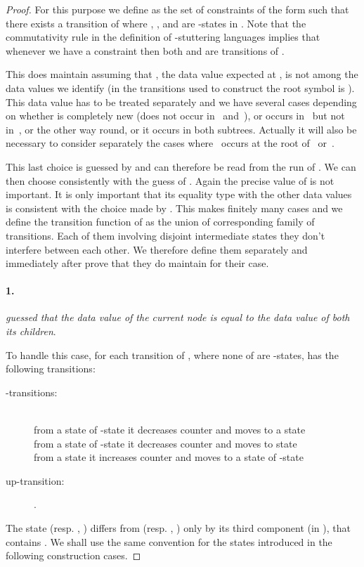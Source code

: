 \documentclass{CSML}
\begin{document}
\begin{proof}
For this purpose we define  as the set of constraints of the form
 such that there exists a transition  of  where , , and  are -states in
.  Note that the commutativity rule in the
definition of -stuttering languages implies that whenever we have a
constraint  then both  and
 are transitions of .

This does maintain  assuming that , the data value expected at ,
is not among the data values we identify (in the transitions used to construct
 the root symbol is ). This data value  has to be treated
separately and we have several cases depending on whether  is completely new
(does not occur in~ and~), or occurs in~ but
not in~, or the other way round, or it occurs in both subtrees. Actually it
will also be necessary to consider separately the cases where~ occurs at the
root of~ or~.

This last choice is guessed by  and can therefore be read from the run
of . We can then choose  consistently with the guess of . Again
the precise value of  is not important. It is only important that its
equality type with the other data values is consistent with the choice made by
. This makes finitely many cases and we define the transition function of
 as the union of corresponding family of transitions. Each of them
involving disjoint intermediate states they don't interfere between each
other. We therefore define them separately and immediately after prove that they
do maintain  for their case.

\medskip


\paragraph{\bf 1.}
\emph{ guessed that the data value of the current node 
 is equal to the data value of both its children}.

\noindent
To handle this case, for each transition  of , 
where none of  are -states,  has the following transitions:
\begin{description}
\item[\rm -transitions:] \quad\\
from a state  of -state  
it decreases counter  
and moves to a state \\ from a state  of -state 
it decreases counter  
and moves to state \\
from a state  
it increases counter  
and moves to a state  of -state 

\item[\rm up-transition:]
.
\end{description}
The state  (resp. , ) 
differs from   (resp. , )
only by its third component (in ), that contains .
We shall use the same convention for the states introduced in the 
following construction cases.


\end{proof}
\end{document}
